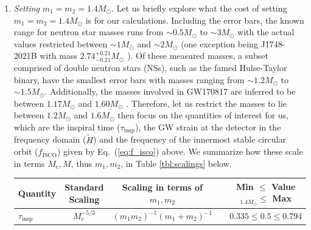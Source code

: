 \documentclass[prd,amsmath,amssymb,aps,floats,amsfonts,notitlepage,superscriptaddress,eqsecnum,nofootinbib,10pt]{revtex4-1}
\newcommand\T{\rule{0pt}{2.6ex}}       %
\newcommand\B{\rule[-1.2ex]{0pt}{0pt}} %
\begin{document}
\begin{enumerate}
%
\item {\it Setting} $m_1=m_2=1.4 M_\odot$.
Let us briefly explore what the cost of setting $m_1=m_2=1.4 M_\odot$ is for our calculations. 
Including the error bars, the known range for neutron star masses runs from $\sim 0.5 M_\odot$ to $ \sim 3 M_\odot$ with the actual values restricted
between $\sim 1 M_\odot$ and $\sim 2 M_\odot$ \cite{Ozel_Freire} (one exception being J1748-2021B with mass $2.74^{+0.21}_{-0.21} M_\odot $ \cite{Freire_et_al_2007}).
Of these measured masses, a subset comprised of double neutron stars (NSs), such as the famed Hulse-Taylor binary, have the smallest error bars with masses
ranging from $\sim 1.2 M_\odot$ to $\sim 1.5 M_\odot$. 
Additionally, the masses involved in GW170817 are inferred to be between $1.17 M_\odot$ and $1.60 M_\odot$ \cite{GW170817}.
Therefore, let us restrict the masses to lie between $1.2 M_\odot$ and $1.6 M_\odot$ then focus on %
the quantities of interest for us, which are %
the inspiral time ($\tau_\text{insp}$), the GW strain at the detector in the frequency domain ($\tilde{H}$) and
the frequency of the innermost stable circular orbit ($f_\text{ISCO}$) given by Eq.~(\ref{eq:f_isco}) above.
We summarize how these scale in terms $M_c, M$, thus $m_1, m_2$, in Table \ref{tbl:scalings} below.
%
\begin{center}
\begin{table}[ht]
\begin{tabular}{|l|cccc|}
\hline
 Quantity & Standard Scaling & \hspace{3mm}Scaling in terms of $m_1,m_2$ & &\hspace{0.5cm} Min $\le$ Value$_{1.4M_\odot} \le$ Max\T\B\\
\hline
$\tau_\text{insp}$ & $M_c^{-5/3} $ & $(m_1 m_2)^{-1}(m_1+m_2)^{-1} $&\quad& $0.335\le 0.5\le 0.794 $ \\

\end{tabular}
\end{table}
\end{center}
\end{enumerate}
\end{document}
